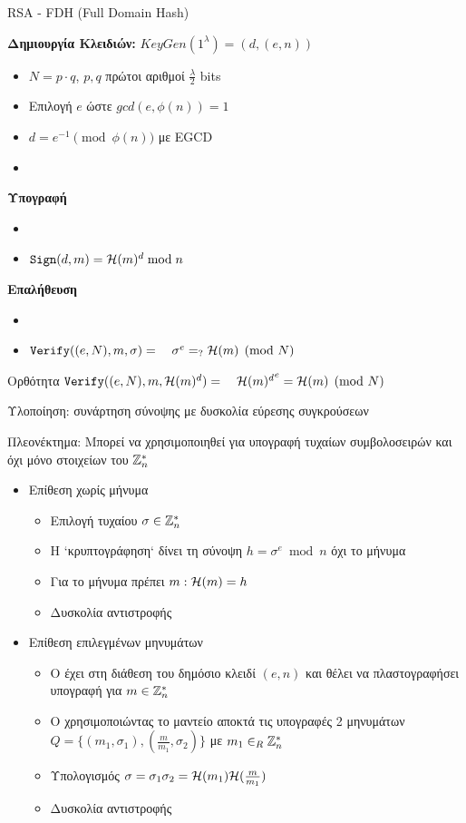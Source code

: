 \documentclass[handout]{beamer}
\begin{document}
\begin{frame}[allowframebreaks]{RSA - FDH (Full Domain Hash)}
 

\textbf{Δημιουργία Κλειδιών:}
$KeyGen(1^{\lambda}) = (d,(e,n))$
\begin{itemize}
\item $N=p \cdot q$, $p,q$ πρώτοι αριθμοί $\frac{\lambda}{2}$ bits
\item Επιλογή $e$ ώστε $gcd(e,\phi(n))=1$
\item $d = e^{-1} \pmod{\phi(n)}$ με EGCD
\item {}
\end{itemize}
  
\textbf{Υπογραφή} 
\begin{itemize}
\item {}
\item $\mathtt{Sign}(d, m) = \mathcal{H}(m)^d \bmod n$
\end{itemize}
\textbf{Επαλήθευση}
\begin{itemize}
\item {}
\item $\verify((e,N), m, \sigma) = \ \ \ \sigma^e =_? \Hash(m) \pmod{N}$
\end{itemize} 

\begin{block}{Ορθότητα}
$\mathtt{Verify}((e,N), m, \mathcal{H}(m)^d)= \ \ \  {\mathcal{H}(m)^d}^e = \mathcal{H}(m) \pmod{N}$
\end{block}
Υλοποίηση: συνάρτηση σύνοψης με δυσκολία εύρεσης συγκρούσεων
 
Πλεονέκτημα: Μπορεί να χρησιμοποιηθεί για υπογραφή τυχαίων συμβολοσειρών και όχι μόνο στοιχείων του $\mathbb{Z}^*_n$\

\framebreak

\begin{itemize}
\item Επίθεση χωρίς μήνυμα
\begin{itemize}
\item Επιλογή τυχαίου $\sigma \in \mathbb{Z}^*_n$
\item Η `κρυπτογράφηση` δίνει τη σύνοψη $h=\sigma^e \bmod{n}$ όχι το μήνυμα
\item Για το μήνυμα πρέπει $m: \mathcal{H}(m) = h$
\item Δυσκολία αντιστροφής
\end{itemize}
\framebreak

\item Επίθεση επιλεγμένων μηνυμάτων
\begin{itemize}
\item O \adv έχει στη διάθεση του δημόσιο κλειδί $(e,n)$ και θέλει να πλαστογραφήσει υπογραφή για $m \in \mathbb{Z}^*_n$
\item O \adv χρησιμοποιώντας το μαντείο αποκτά τις υπογραφές 2 μηνυμάτων $Q = \{ (m_1, \sigma_1), (\frac{m}{m_1}, \sigma_2) \}$ με $m_1 \in_R \mathbb{Z}^*_n $
\item Υπολογισμός $\sigma = \sigma_1  \sigma_2 = \mathcal{H}(m_1) \mathcal{H}(\frac{m}{m_1}) $
\item Δυσκολία αντιστροφής
\end{itemize}
\end{itemize} 



\end{frame}
\end{document}
